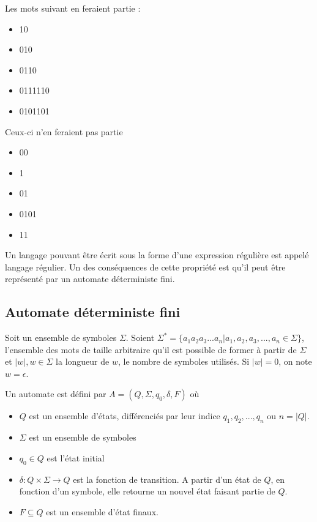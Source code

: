 	\begin{minipage}{0.5\linewidth}
		Les mots suivant en feraient partie :
		\begin{itemize}
			\item 10
			\item 010
			\item 0110
			\item 0111110
			\item 0101101
		\end{itemize}
	\end{minipage}
	\begin{minipage}{0.5\linewidth}
		Ceux-ci n'en feraient pas partie
		\begin{itemize}
			\item 00
			\item 1
			\item 01
			\item 0101
			\item 11
		\end{itemize}
	\end{minipage}

	Un langage pouvant être écrit sous la forme d'une expression régulière est appelé langage régulier. Un des conséquences de cette propriété est qu'il peut être représenté par un automate déterministe fini. 
	
	
	\subsection{Automate déterministe fini}\label{sub:dfa}
	Soit un ensemble de symboles $\Sigma$. Soient $\Sigma^* = \{ a_1a_2a_3...a_n | a_1,a_2,a_3,...,a_n \in \Sigma \}$, l'ensemble des mots de taille arbitraire qu'il est possible de former à partir de $\Sigma$ et $|w|, w \in \Sigma$ la longueur de $w$, le nombre de symboles utilisés. Si $|w|=0$, on note $w=\epsilon$.
	
	
	Un automate est défini par $A = (Q, \Sigma, q_0, \delta, F)$ où
	\begin{itemize}
		\item $Q$ est un ensemble d'états, différenciés par leur indice $q_1, q_2, ..., q_n$ ou $n = |Q|$.
		\item $\Sigma$ est un ensemble de symboles
		\item $q_0 \in Q$ est l'état initial
		\item $\delta : Q \times \Sigma \rightarrow Q$ est la fonction de transition. A partir d'un état de $Q$, en fonction d'un symbole, elle retourne un nouvel état faisant partie de $Q$.
		\item $F \subseteq Q$ est un ensemble d'état finaux.
	\end{itemize}
	 
